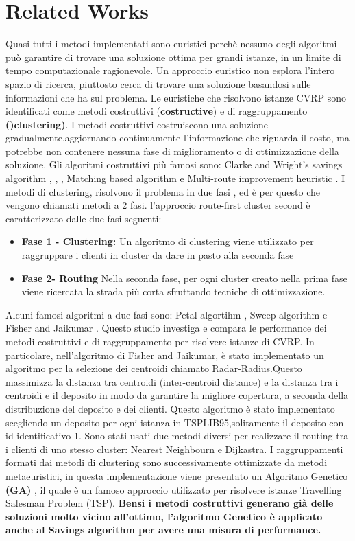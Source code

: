 \documentclass[]{article}
\begin{document}
\section{Related Works}
Quasi tutti i metodi implementati sono euristici perchè nessuno degli algoritmi può garantire di trovare una soluzione ottima per grandi istanze, in un limite di tempo computazionale ragionevole.
Un approccio euristico non esplora l'intero spazio di ricerca, piuttosto cerca di trovare una soluzione basandosi sulle informazioni che ha sul problema.
Le euristiche che risolvono istanze CVRP sono identificati come metodi costruttivi (\textbf{costructive}) e di raggruppamento \textbf{()clustering)}.
I metodi costruttivi costruiscono una soluzione gradualmente,aggiornando continuamente l'informazione che riguarda il costo, ma potrebbe non contenere nessuna fase di miglioramento o di ottimizzazione della soluzione.
Gli algoritmi costruttivi più famosi sono: Clarke and Wright's savings algorithm \cite{CK1}, \cite{CK2} , \cite{CK3} , Matching based algorithm e Multi-route improvement heuristic \cite{CK3}.
I metodi di clustering, risolvono il problema in due fasi , ed è per questo che vengono chiamati metodi a 2 fasi.  l'approccio route-first cluster second è caratterizzato dalle due fasi seguenti:
\begin{itemize}
\item \textbf{Fase 1 - Clustering:} Un algoritmo di clustering viene utilizzato per raggruppare i clienti in cluster da dare in pasto alla seconda fase
\item \textbf{Fase 2- Routing} Nella seconda fase, per ogni cluster creato nella prima fase viene ricercata la strada più corta sfruttando tecniche di ottimizzazione.
\end{itemize}
Alcuni famosi algoritmi a due fasi sono: Petal algortihm \cite{petal}, Sweep algorithm \cite{sweep} e Fisher and Jaikumar \cite{FJ}.
Questo studio investiga e compara le performance dei metodi costruttivi e di raggruppamento per risolvere istanze di CVRP.
In particolare, nell'algoritmo di Fisher and Jaikumar, è stato implementato un algoritmo per la selezione dei centroidi chiamato Radar-Radius.Questo  massimizza la distanza tra centroidi (inter-centroid distance) e la distanza tra i centroidi e il deposito in modo da garantire la migliore copertura, a seconda della distribuzione del deposito e dei clienti.
Questo algoritmo è stato implementato scegliendo un deposito per ogni istanza in TSPLIB95,solitamente il deposito con id identificativo 1.
Sono stati usati due metodi diversi per realizzare il routing tra i clienti di uno stesso cluster: Nearest Neighbourn e Dijkastra.
I raggruppamenti formati dai metodi di clustering sono successivamente ottimizzate da metodi metaeuristici, in questa implementazione viene presentato un Algoritmo Genetico  \textbf{(GA)} \cite{GA}, il quale è un famoso approccio utilizzato per risolvere istanze Travelling Salesman Problem (TSP).
\textbf{Bensi i metodi costruttivi generano già delle soluzioni molto vicino all'ottimo, l'algoritmo Genetico è applicato anche al Savings algorithm per avere una misura di performance.}
\end{document}
